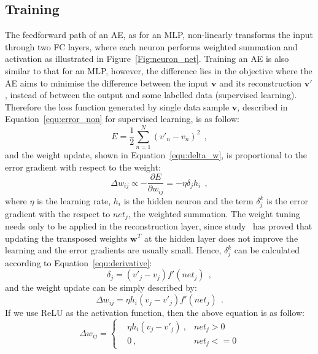 \subsection{Training}
The feedforward path of an AE, as for an MLP, non-linearly transforms the input through two FC layers, where each neuron performs weighted summation and activation as illustrated in Figure~\ref{Fig:neuron_net}.
Training an AE is also similar to that for an MLP, however, the difference lies in the objective where the AE aims to minimise the difference between the input $\mathbf{v}$ and its reconstruction $\mathbf{v'}$, instead of between the output and some labelled data (supervised learning).
Therefore the loss function generated by \protect{} single data sample $\mathbf{v}$, described in Equation~\ref{equ:error_non} for supervised learning, is as follow:
\begin{equation}
E = \frac{1}{2}\sum_{n=1}^N (v'_{n}-v_{n})^{2}~~,
\end{equation}
and the weight update, shown in Equation~\ref{equ:delta_w}, is proportional to the error gradient with respect to the weight:
\begin{equation}
\Delta w_{ij} \propto -\frac{\partial E}{\partial w_{ij}} = -\eta \delta_j h_i~~,
\end{equation}
where $\eta$ is the learning rate, $h_i$ is the hidden neuron and the term $\delta^k_j$ is the error gradient with the respect to $net_j$, the weighted summation.
The weight tuning needs only to be applied in the reconstruction layer, since study~\citep{xu1993least} has proved that updating the transposed weights $\mathbf{w}^T$ at the hidden layer does not improve the learning and the error gradients are usually small.
Hence, $\delta^k_j$  can be calculated according to Equation~\ref{equ:derivative}:
\begin{equation}
\delta_j = (v'_{j}-v_{j}) f'(net_j)~~,
\end{equation}
and the weight update can be simply described by:
\begin{equation}
\Delta w_{ij} = \eta h_i (v_{j}-v'_{j})  f'(net_j)~~.
\end{equation}
If we use ReLU as the activation function, then the above equation is as follow:
\begin{equation}
\label{equ:ae_widrow_hoff}
\Delta w_{ij} = \left \{
\begin{aligned}
& \eta h_i(v_j - v'_j)~, & net_j > 0 \\
& 0~, & net_j < = 0
\end{aligned} 
\right.
\end{equation}


